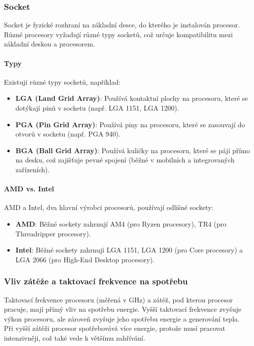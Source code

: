 \subsubsection{Socket}
Socket je fyzické rozhraní na základní desce, do kterého je instalován procesor. Různé procesory vyžadují různé typy socketů, což určuje kompatibilitu mezi základní deskou a procesorem.

\paragraph{Typy}
Existují různé typy socketů, například:
\begin{itemize}
\item \textbf{LGA (Land Grid Array)}: Používá kontaktní plochy na procesoru, které se dotýkají pinů v socketu (např. LGA 1151, LGA 1200).
\item \textbf{PGA (Pin Grid Array)}: Používá piny na procesoru, které se zasouvají do otvorů v socketu (např. PGA 940).
\item \textbf{BGA (Ball Grid Array)}: Používá kuličky na procesoru, které se pájí přímo na desku, což zajišťuje pevné spojení (běžné v mobilních a integrovaných zařízeních).
\end{itemize}

\paragraph{AMD vs. Intel}
AMD a Intel, dva hlavní výrobci procesorů, používají odlišné sockety:
\begin{itemize}
\item \textbf{AMD}: Běžné sockety zahrnují AM4 (pro Ryzen procesory), TR4 (pro Threadripper procesory).
\item \textbf{Intel}: Běžné sockety zahrnují LGA 1151, LGA 1200 (pro Core procesory) a LGA 2066 (pro High-End Desktop procesory).
\end{itemize}

\subsubsection{Vliv zátěže a taktovací frekvence na spotřebu}
Taktovací frekvence procesoru (měřená v GHz) a zátěž, pod kterou procesor pracuje, mají přímý vliv na spotřebu energie. Vyšší taktovací frekvence zvyšuje výkon procesoru, ale zároveň zvyšuje jeho spotřebu energie a generování tepla. Při vyšší zátěži procesor spotřebovává více energie, protože musí pracovat intenzivněji, což také vede k většímu zahřívání.

